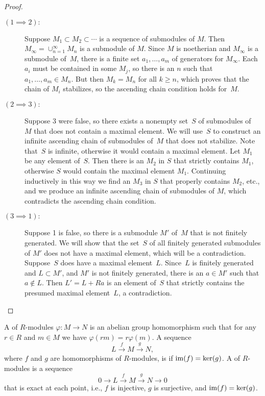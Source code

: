 \begin{proof}
  \hfill
  \begin{description}
    \item[$(1 \implies 2):$]
      Suppose $M_1\subset M_2\subset \cdots$ is a
      sequence of submodules of $M$.  Then
      $M_\infty=\cup_{n=1}^{\infty} M_n$ is a submodule of $M$.
      Since $M$ is noetherian and $M_\infty$ is a submodule of~$M$,
      there is a finite set $a_1,\dots, a_m$ of
      generators for $M_{\infty}$.  Each $a_i$
      must be contained in some $M_j$, so there is an $n$ such that
      $a_1,\dots, a_m\in M_n$.  But then $M_{k}=M_n$ for all
      $k\geq n$, which proves that the chain of $M_i$ stabilizes,
      so the ascending chain condition holds for~$M$.

    \item[$(2 \implies 3):$]
      Suppose 3 were false, so there exists
      a nonempty set~$S$ of submodules of~$M$ that does not
      contain a maximal element.  We will use~$S$ to construct
      an infinite ascending chain of submodules of~$M$ that
      does not stabilize. Note that~$S$ is infinite, otherwise
      it would contain a maximal element.  Let $M_1$ be
      any element of~$S$.  Then there is an $M_2$ in $S$ that
      strictly contains $M_1$, otherwise $S$ would contain the maximal
      element $M_1$. Continuing inductively in this way we find
      an $M_3$ in $S$ that properly contains $M_2$, etc., and we
      produce an infinite ascending chain of submodules of $M$,
      which contradicts the ascending chain condition.

    \item[$(3 \implies 1):$]
      Suppose 1 is false, so there is a submodule $M'$ of~$M$ that
      is not finitely generated.  We will show that the set~$S$ of
      all finitely generated submodules of $M'$ does not
      have a maximal element, which will be a contradiction.
      Suppose~$S$ does have a maximal element~$L$.  Since~$L$
      is finitely generated and $L\subset M'$, and $M'$ is not
      finitely generated, there is an $a\in M'$ such that
      $a\not\in L$.  Then $L'=L+Ra$ is an element of~$S$ that
      strictly contains the presumed maximal element~$L$,
      a contradiction.
  \end{description}
\end{proof}

\begin{definition}
  A  of $R$-modules $\varphi:M\to N$ is an abelian
  group homomorphism such that for any $r\in R$ and $m\in M$ we have
  $\varphi(rm) = r\varphi(m)$. A sequence
  $$
    L \xrightarrow{f} M \xrightarrow{g} N,
  $$
  where $f$ and $g$ are homomorphisms of $R$-modules, is 
  if $\operatorname{im}(f)=\ker(g)$. A  of $R$-modules
  is a sequence
  $$
    0 \to L \xrightarrow{f} M \xrightarrow{g} N \to 0
  $$
  that is exact at each point, i.e., $f$ is injective, $g$ is surjective,
  and $\operatorname{im}(f) = \ker(g)$.
\end{definition}

